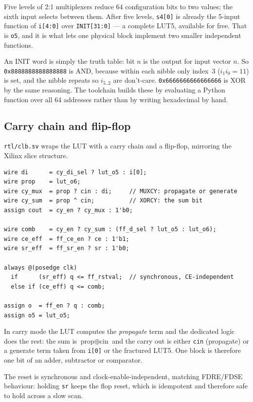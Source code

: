 \documentclass[11pt,a4paper]{article}
\newcommand{\file}[1]{\texttt{#1}}
\newcommand{\sig}[1]{\texttt{#1}}
\begin{document}
Five levels of 2:1 multiplexers reduce 64 configuration bits to two values; the
sixth input selects between them. After five levels, \texttt{s4[0]} is already
the 5-input function of \texttt{i[4:0]} over \texttt{INIT[31:0]} --- a complete
LUT5, available for free. That is \sig{o5}, and it is what lets one physical
block implement two smaller independent functions.

An INIT word is simply the truth table: bit $n$ is the output for input vector
$n$. So \texttt{0x8888888888888888} is AND, because within each nibble only
index~3 ($i_1 i_0 = 11$) is set, and the nibble repeats so $i_{5..2}$ are
don't-care. \texttt{0x6666666666666666} is XOR by the same reasoning. The
toolchain builds these by evaluating a Python function over all 64 addresses
rather than by writing hexadecimal by hand.

\subsection{Carry chain and flip-flop}

\file{rtl/clb.sv} wraps the LUT with a carry chain and a flip-flop, mirroring
the Xilinx slice structure.

\begin{lstlisting}[style=v]
wire di      = cy_di_sel ? lut_o5 : i[0];
wire prop    = lut_o6;
wire cy_mux  = prop ? cin : di;     // MUXCY: propagate or generate
wire cy_sum  = prop ^ cin;          // XORCY: the sum bit
assign cout  = cy_en ? cy_mux : 1'b0;

wire comb    = cy_en ? cy_sum : (ff_d_sel ? lut_o5 : lut_o6);
wire ce_eff  = ff_ce_en ? ce : 1'b1;
wire sr_eff  = ff_sr_en ? sr : 1'b0;

always @(posedge clk)
  if      (sr_eff) q <= ff_rstval;  // synchronous, CE-independent
  else if (ce_eff) q <= comb;

assign o  = ff_en ? q : comb;
assign o5 = lut_o5;
\end{lstlisting}

In carry mode the LUT computes the \emph{propagate} term and the dedicated logic
does the rest: the sum is $\text{prop} \oplus \text{cin}$ and the carry out is
either \sig{cin} (propagate) or a generate term taken from \texttt{i[0]} or the
fractured LUT5. One block is therefore one bit of an adder, subtractor or
comparator.

The reset is synchronous and clock-enable-independent, matching FDRE/FDSE
behaviour: holding \sig{sr} keeps the flop reset, which is idempotent and
therefore safe to hold across a slow scan.
\end{document}
